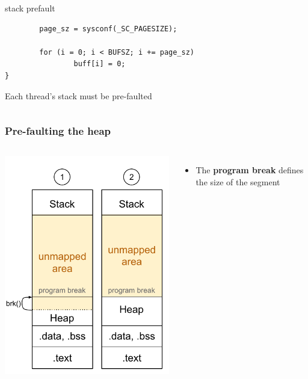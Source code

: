 \begin{frame}[fragile]
\begin{columns}
\begin{column}{0.65\textwidth}
\begin{block}{stack prefault}
\begin{verbatim}
        page_sz = sysconf(_SC_PAGESIZE);

        for (i = 0; i < BUFSZ; i += page_sz)
                buff[i] = 0;
}
				\end{verbatim}
			\end{block}
		Each thread's stack must be pre-faulted
		\end{column}
	\end{columns}

\end{frame}

\begin{frame}
	\frametitle{Pre-faulting the heap}
	\begin{columns}
    \includegraphics[width=\textwidth]{slides/realtime-linux-application-development/prefault_heap.pdf}
			\begin{itemize}
				\item The \textbf{program break} defines the size of the  segment

\end{itemize}
\end{columns}
\end{frame}
